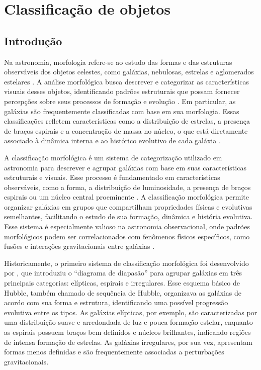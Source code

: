 \chapter{Classificação de objetos}
\label{cap:classificacao}


\begin{overview}
  \lipsum[1]
\end{overview}


\section{Introdução}
\label{sec:morfologia}

Na astronomia, morfologia refere-se ao estudo das formas e das estruturas observáveis dos objetos celestes, como galáxias, nebulosas, estrelas e aglomerados estelares \cite{buta2011galaxy}. A análise morfológica busca descrever e categorizar as características visuais desses objetos, identificando padrões estruturais que possam fornecer percepções sobre seus processos de formação e evolução \cite{steinmetz2002galaxy}. Em particular, as galáxias são frequentemente classificadas com base em sua morfologia. Essas classificações refletem características como a distribuição de estrelas, a presença de braços espirais e a concentração de massa no núcleo, o que está diretamente associado à dinâmica interna e ao histórico evolutivo de cada galáxia \cite{van1998galaxy}.

A classificação morfológica é um sistema de categorização utilizado em astronomia para descrever e agrupar galáxias com base em suas características estruturais e visuais. Esse processo é fundamentado em características observáveis, como a forma, a distribuição de luminosidade, a presença de braços espirais ou um núcleo central proeminente \cite{steinmetz2002galaxy}. A classificação morfológica permite organizar galáxias em grupos que compartilham propriedades físicas e evolutivas semelhantes, facilitando o estudo de sua formação, dinâmica e história evolutiva. Esse sistema é especialmente valioso na astronomia observacional, onde padrões morfológicos podem ser correlacionados com fenômenos físicos específicos, como fusões e interações gravitacionais entre galáxias \cite{van1998galaxy}.

Historicamente, o primeiro sistema de classificação morfológica foi desenvolvido por , que introduziu o ``diagrama de diapasão'' para agrupar galáxias em três principais categorias: elípticas, espirais e irregulares. Esse esquema básico de Hubble, também chamado de sequência de Hubble, organizava as galáxias de acordo com sua forma e estrutura, identificando uma possível progressão evolutiva entre os tipos. As galáxias elípticas, por exemplo, são caracterizadas por uma distribuição suave e arredondada de luz e pouca formação estelar, enquanto as espirais possuem braços bem definidos e núcleos brilhantes, indicando regiões de intensa formação de estrelas. As galáxias irregulares, por sua vez, apresentam formas menos definidas e são frequentemente associadas a perturbações gravitacionais.

